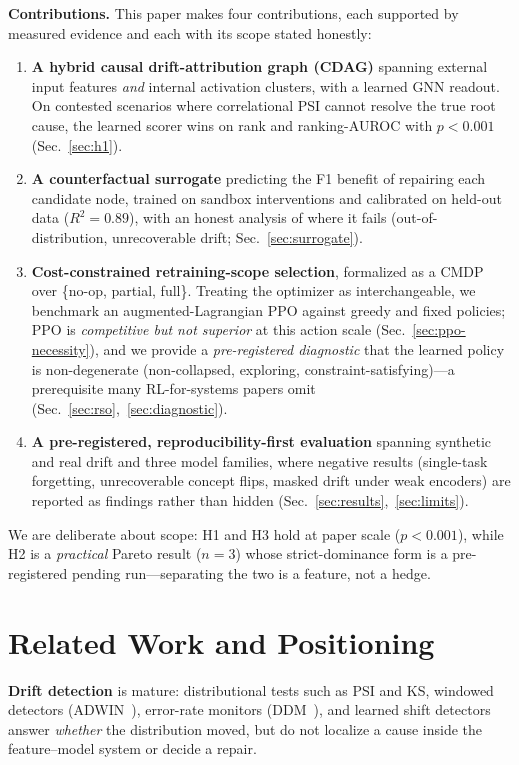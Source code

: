 \documentclass[conference]{IEEEtran}
\begin{document}
\textbf{Contributions.} This paper makes four contributions, each
supported by measured evidence and each with its scope stated honestly:
\begin{enumerate}
\item \textbf{A hybrid causal drift-attribution graph (CDAG)} spanning
external input features \emph{and} internal activation clusters, with a
learned GNN readout. On contested scenarios where correlational PSI
cannot resolve the true root cause, the learned scorer wins on rank and
ranking-AUROC with $p<0.001$ (Sec.~\ref{sec:h1}).
\item \textbf{A counterfactual surrogate} predicting the F1 benefit of
repairing each candidate node, trained on sandbox interventions and
calibrated on held-out data ($R^2=0.89$), with an honest analysis of where
it fails (out-of-distribution, unrecoverable drift; Sec.~\ref{sec:surrogate}).
\item \textbf{Cost-constrained retraining-scope selection}, formalized as a
CMDP over \{no-op, partial, full\}. Treating the optimizer as
interchangeable, we benchmark an augmented-Lagrangian PPO against greedy
and fixed policies; PPO is \emph{competitive but not superior} at this
action scale (Sec.~\ref{sec:ppo-necessity}), and we provide a
\emph{pre-registered diagnostic} that the learned policy is non-degenerate
(non-collapsed, exploring, constraint-satisfying)---a prerequisite many
RL-for-systems papers omit (Sec.~\ref{sec:rso},~\ref{sec:diagnostic}).
\item \textbf{A pre-registered, reproducibility-first evaluation} spanning
synthetic and real drift and three model families, where negative results
(single-task forgetting, unrecoverable concept flips, masked drift under
weak encoders) are reported as findings rather than hidden
(Sec.~\ref{sec:results},~\ref{sec:limits}).
\end{enumerate}

We are deliberate about scope: H1 and H3 hold at paper scale ($p<0.001$),
while H2 is a \emph{practical} Pareto result ($n{=}3$) whose
strict-dominance form is a pre-registered pending run---separating the two
is a feature, not a hedge.

\section{Related Work and Positioning}\label{sec:related}
\textbf{Drift detection} is mature: distributional tests such as PSI and
KS, windowed detectors (ADWIN~\cite{bifet2007adwin}), error-rate monitors
(DDM~\cite{gama2004ddm}), and learned shift detectors~\cite{rabanser2019failing}
answer \emph{whether} the distribution moved, but do not localize a cause
inside the feature--model system or decide a repair.
\end{document}
